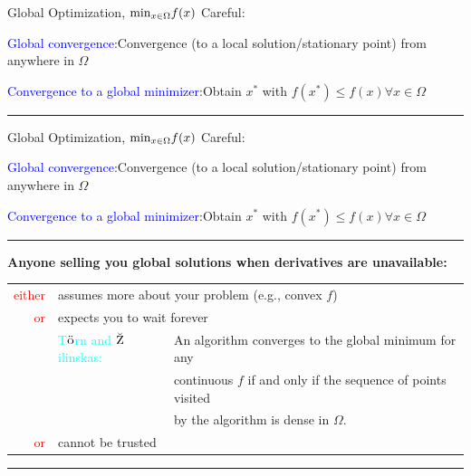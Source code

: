 \documentclass[handout,aspectratio=54]{beamer}
\numberwithin{theorem}{section}
\begin{document}
\begin{frame}{Global Optimization, $\textup{min}_{x\in\Omega} f(x)$}
Careful:
\begin{itemize}
\small{
\item \textcolor{blue}{Global convergence}:Convergence (to a local solution/stationary point) from anywhere in $\Omega$
\item \textcolor{blue}{Convergence to a global minimizer}:Obtain $x^*$ with $f(x^*)\le f(x)\forall x\in\Omega$
}
\end{itemize}

\rule{\textwidth}{1pt}
\vspace{4.5cm}
\end{frame}

\begin{frame}{Global Optimization, $\textup{min}_{x\in\Omega} f(x)$}
Careful:
\begin{itemize}
\small{
\item \textcolor{blue}{Global convergence}:Convergence (to a local solution/stationary point) from anywhere in $\Omega$
\item \textcolor{blue}{Convergence to a global minimizer}:Obtain $x^*$ with $f(x^*)\le f(x)\forall x\in\Omega$
}
\end{itemize}

\rule{\textwidth}{1pt}
\footnotesize{
\textbf{Anyone selling you global solutions when derivatives are unavailable:}
}
\begin{table}[]\scriptsize
\begin{tabular}{rll}
\textcolor{red}{either}   & \multicolumn{2}{l}{assumes more about your problem (e.g., convex $f$)}\\
\textcolor{red}{or} & \multicolumn{2}{l}{expects you to wait forever} \\
 & \textcolor{cyan}{T$\ddot{\textup{o}}$rn and $\breve{\textup{Z}}$ilinskas:} & An algorithm converges to the global minimum for any \\
         &                      & continuous $f$ if and only if the sequence of points visited  \\
   &            & by the algorithm is dense in $\Omega$.\\
\textcolor{red}{or} & \multicolumn{2}{l}{cannot be trusted}          
\end{tabular}
\end{table}

\rule{\textwidth}{1pt}
\vspace{1.4cm} 
\end{frame}
\end{document}
